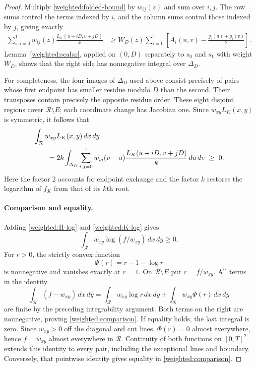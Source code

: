 \begin{proof}
Multiply \eqref{weighted:folded-bound} by $w_{ij}(z)$ and sum over
$i,j$.  The row sums control the terms indexed by $i$, and the column
sums control those indexed by $j$, giving exactly
\begin{align}
 \sum_{i,j=0}^1 w_{ij}(z)\frac{L_K(u+iD,v+jD)}k
 &\geq W_D(z)\sum_{i=0}^1
 \left[A_i(u,v)-\frac{g_i(u)+g_i(v)}2\right].
 \label{weighted:folded-sum}
\end{align}
Lemma~\ref{weighted:scalar}, applied on $(0,D)$ separately to $s_0$
and $s_1$ with weight $W_D$, shows that the right side has nonnegative
integral over $\Delta_D$.

For completeness, the four images of $\Delta_D$ used above consist
precisely of pairs whose first endpoint has smaller residue modulo $D$
than the second.  Their transposes contain precisely the opposite
residue order.  These eight disjoint regions cover $\mathcal R\setminus E$;
each coordinate change has Jacobian one.  Since $w_{xy}L_K(x,y)$ is
symmetric, it follows that
\begin{align}
 &\int_{\mathcal R}w_{xy}L_K(x,y)\,dx\,dy\notag\\
 &\qquad=2k\int_{\Delta_D}\sum_{i,j=0}^1
 w_{ij}(v-u)\frac{L_K(u+iD,v+jD)}k\,du\,dv
 \ \geq\ 0.
 \label{weighted:K-log}
\end{align}
Here the factor $2$ accounts for endpoint exchange and the factor $k$
restores the logarithm of $f_K$ from that of its $k$th root.

\paragraph{Comparison and equality.}
Adding \eqref{weighted:H-log} and \eqref{weighted:K-log} gives
\[
 \int_{\mathcal R}w_{xy}\log(f/w_{xy})\,dx\,dy\geq0.
\]
For $r>0$, the strictly convex function
\[
 \Phi(r)=r-1-\log r
\]
is nonnegative and vanishes exactly at $r=1$.  On
$\mathcal R\setminus E$ put $r=f/w_{xy}$.  All terms in the identity
\begin{equation}
 \int_{\mathcal R}(f-w_{xy})\,dx\,dy
 =\int_{\mathcal R}w_{xy}\log r\,dx\,dy
  +\int_{\mathcal R}w_{xy}\Phi(r)\,dx\,dy
 \label{weighted:strict-gap}
\end{equation}
are finite by the preceding integrability argument.  Both terms on
the right are nonnegative, proving \eqref{weighted:comparison}.
If equality holds, the last integral is zero.  Since $w_{xy}>0$ off
the diagonal and cut lines, $\Phi(r)=0$ almost everywhere, hence
$f=w_{xy}$ almost everywhere in $\mathcal R$.
Continuity of both functions on $[0,T]^2$ extends this identity to
every pair, including the exceptional lines and boundary.  Conversely,
that pointwise identity gives equality in \eqref{weighted:comparison}.
\end{proof}
